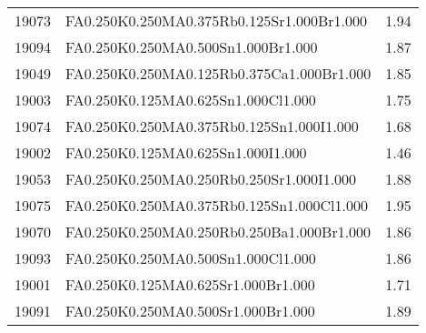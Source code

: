 \begin{table}[htbp]
\begin{tabular}{rlr}
19073 & FA0.250K0.250MA0.375Rb0.125Sr1.000Br1.000 & 1.94\\[0pt]
19094 & FA0.250K0.250MA0.500Sn1.000Br1.000 & 1.87\\[0pt]
19049 & FA0.250K0.250MA0.125Rb0.375Ca1.000Br1.000 & 1.85\\[0pt]
19003 & FA0.250K0.125MA0.625Sn1.000Cl1.000 & 1.75\\[0pt]
19074 & FA0.250K0.250MA0.375Rb0.125Sn1.000I1.000 & 1.68\\[0pt]
19002 & FA0.250K0.125MA0.625Sn1.000I1.000 & 1.46\\[0pt]
19053 & FA0.250K0.250MA0.250Rb0.250Sr1.000I1.000 & 1.88\\[0pt]
19075 & FA0.250K0.250MA0.375Rb0.125Sn1.000Cl1.000 & 1.95\\[0pt]
19070 & FA0.250K0.250MA0.250Rb0.250Ba1.000Br1.000 & 1.86\\[0pt]
19093 & FA0.250K0.250MA0.500Sn1.000Cl1.000 & 1.86\\[0pt]
19001 & FA0.250K0.125MA0.625Sr1.000Br1.000 & 1.71\\[0pt]
19091 & FA0.250K0.250MA0.500Sr1.000Br1.000 & 1.89\\[0pt]
\end{tabular}
\end{table}
